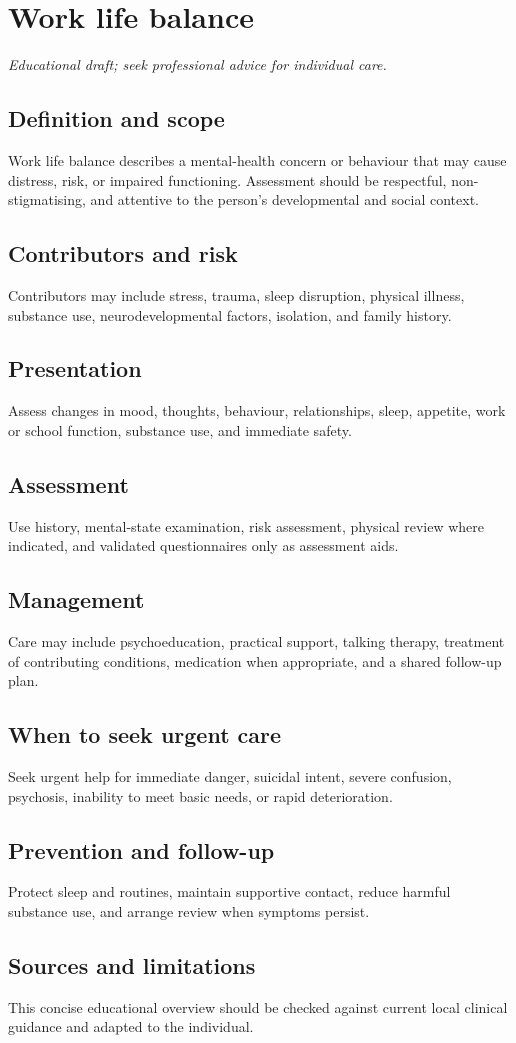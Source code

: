\chapter{Work life balance}
\medskip
\noindent\textit{Educational draft; seek professional advice for individual care.}

\section*{Definition and scope}
Work life balance describes a mental-health concern or behaviour that may cause distress, risk, or impaired functioning. Assessment should be respectful, non-stigmatising, and attentive to the person’s developmental and social context.

\section*{Contributors and risk}
Contributors may include stress, trauma, sleep disruption, physical illness, substance use, neurodevelopmental factors, isolation, and family history.

\section*{Presentation}
Assess changes in mood, thoughts, behaviour, relationships, sleep, appetite, work or school function, substance use, and immediate safety.

\section*{Assessment}
Use history, mental-state examination, risk assessment, physical review where indicated, and validated questionnaires only as assessment aids.

\section*{Management}
Care may include psychoeducation, practical support, talking therapy, treatment of contributing conditions, medication when appropriate, and a shared follow-up plan.

\section*{When to seek urgent care}
Seek urgent help for immediate danger, suicidal intent, severe confusion, psychosis, inability to meet basic needs, or rapid deterioration.

\section*{Prevention and follow-up}
Protect sleep and routines, maintain supportive contact, reduce harmful substance use, and arrange review when symptoms persist.

\section*{Sources and limitations}
This concise educational overview should be checked against current local clinical guidance and adapted to the individual.
